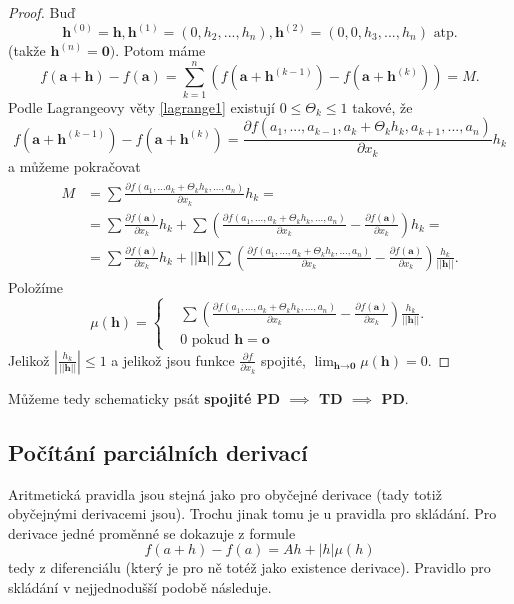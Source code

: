 \documentclass[../main.tex]{subfiles}
\begin{document}
\begin{proof}
	Buď
	\[\textbf{h}^{(0)} = \textbf{h}, \textbf{h}^{(1)} = (0, h_2,...,h_n), \textbf{h}^{(2)} = (0,0,h_3,...,h_n) \textrm{ atp.} \]
	(takže $\textbf{h}^{(n)} = \textbf{0})$.
	Potom máme
	\[f(\textbf{a}+\textbf{h}) - f(\textbf{a}) = \sum^n_{k=1}(f(\textbf{a}+\textbf{h}^{(k-1)})-f(\textbf{a}+\textbf{h}^{(k)})) = M.\]
	Podle Lagrangeovy věty \ref{lagrange1} existují $0 \leq \Theta_k \leq 1$ takové, že
	\[f(\textbf{a}+\textbf{h}^{(k-1)})-f(\textbf{a}+\textbf{h}^{(k)}) = \frac{\partial f(a_1,...,a_{k-1},a_k+ \Theta_kh_k,a_{k+1},...,a_n)}{\partial x_k}h_k\]
	a můžeme pokračovat
	\begin{align*} 
		\begin{split}
			M & = \sum\frac{\partial f(a_1,...a_k+\Theta_kh_k,...,a_n)}{\partial x_k}h_k = \\
			 & = \sum \frac{\partial f(\textbf{a})}{\partial x_k}h_k + \sum \left( \frac{\partial f(a_1,...,a_k+\Theta_kh_k,...,a_n)}{\partial x_k}
			 - \frac{\partial f(\textbf{a})}{\partial x_k} \right)h_k = \\
			 & = \sum \frac{\partial f(\textbf{a})}{\partial x_k}h_k + ||\textbf{h}||\sum\left(\frac{\partial f(a_1,...,a_k+\Theta_kh_k,...,a_n)}
			 {\partial x_k}- \frac{\partial f(\textbf{a})}{\partial x_k}\right)\frac{h_k}{||\textbf{h}||}.
		\end{split}
	\end{align*}
	Položíme
	\[\mu (\textbf{h}) =
	    \begin{cases} & \sum\left(\frac{\partial f(a_1,...,a_k+\Theta_kh_k,...,a_n)}{\partial x_k} -
	    \frac{\partial f(\textbf{a})}{\partial x_k} \right)\frac{h_k}{||\textbf{h}||}.\\
	    & 0 \text{ pokud } \mathbf{h} = \mathbf{o}
	    \end{cases}\]
	Jelikož $\left|\frac{h_k}{||\textbf{h}||}\right| \leq 1$ a jelikož jsou funkce $\frac{\partial f}{\partial x_k}$ spojité,
	$\lim_{\textbf{h}\rightarrow \textbf{0}} \mu (\textbf{h}) = 0$.
\end{proof}

\begin{consequence}
	Můžeme tedy schematicky psát \textbf{spojité PD $\implies$ TD $\implies$ PD}.
\end{consequence}


\subsection{Počítání parciálních derivací}
Aritmetická pravidla jsou stejná jako pro obyčejné derivace (tady totiž obyčejnými derivacemi jsou).
Trochu jinak tomu je u pravidla pro skládání. Pro derivace jedné proměnné se dokazuje z formule
\[ f(a+h) - f(a) = Ah + |h|\mu (h) \]
tedy z diferenciálu (který je pro ně totéž jako existence derivace).
Pravidlo pro skládání v nejjednodušší podobě následuje.
\end{document}
